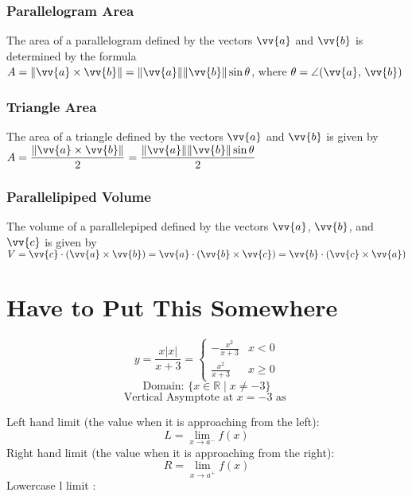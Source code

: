 \documentclass{article}
\newcommand{\mv}[1]{
	\lVert\vv{#1}\rVert
}
\begin{document}
	\subsubsection{Parallelogram Area}
	The area of a parallelogram defined by the vectors $\vv{a}$ and $\vv{b}$ is determined by the formula\\$A=\lVert\vv{a}\times\vv{b}\rVert=\mv{a}\mv{b}\sin\theta$, where $\theta=\angle(\vv{a},\,\vv{b})$
	\subsubsection{Triangle Area}
	The area of a triangle defined by the vectors $\vv{a}$ and $\vv{b}$ is given by $A=\dfrac{\lVert\vv{a}\times\vv{b}\rVert}{2}=\dfrac{\mv{a}\mv{b}\sin\theta}{2}$
	\subsubsection{Parallelipiped Volume}
	The volume of a parallelepiped defined by the vectors $\vv{a}$, $\vv{b}$, and $\vv{c}$ is given by\\$V=\vv{c}\cdot(\vv{a}\times\vv{b})=\vv{a}\cdot(\vv{b}\times\vv{c})=\vv{b}\cdot(\vv{c}\times\vv{a})$

	\section{Have to Put This Somewhere}
	\[y=\frac{x|x|}{x+3}=\begin{cases}
		-\frac{x^2}{x+3}&x<0\\
		\frac{x^2}{x+3}&x\geq0
	\end{cases}\]
	\[\text{Domain: }\{x\in\mathbb{R}\mid x\neq-3\}\]
	\[\text{Vertical Asymptote at }x=-3\text{ as }\]
	
	
	\noindent Left hand limit (the value when it is approaching from the left):\[L=\lim_{x\to a^-}f(x)\]
	Right hand limit (the value when it is approaching from the right):\[R=\lim_{x\to a^+}f(x)\]
	Lowercase l limit : 
	
\end{document}
